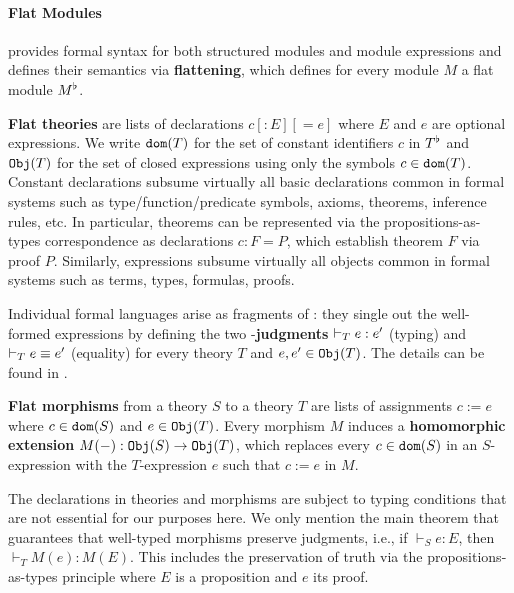 \paragraph{Flat Modules}
\mmt provides formal syntax for both structured modules and module expressions and defines their semantics via \textbf{flattening}, which defines for every module $M$ a flat module $M^\flat$.

\textbf{Flat theories} are lists of declarations $c[:E][=e]$ where $E$ and $e$ are optional expressions.
We write $\mathtt{dom}(T)$ for the set of constant identifiers $c$ in $T^\flat$ and $\mathtt{Obj}(T)$ for the set of closed expressions using only the symbols $c\in\mathtt{dom}(T)$.
Constant declarations subsume virtually all basic declarations common in formal systems such as type/function/predicate symbols, axioms, theorems, inference rules, etc.
In particular, theorems can be represented via the propositions-as-types correspondence as declarations $c:F=P$, which establish theorem $F$ via proof $P$.
Similarly, \mmt expressions subsume virtually all objects common in formal systems such as terms, types, formulas, proofs.

Individual formal languages arise as fragments of \mmt: they single out the well-formed expressions by defining the two \mmt-\textbf{judgments} $\vdash_T e:e'$ (typing) and $\vdash_T e\equiv e'$ (equality) for every theory $T$ and $e,e'\in\mathtt{Obj}(T)$.
The details can be found in \cite{rabe:howto:14}.

\textbf{Flat morphisms} from a theory $S$ to a theory $T$ are lists of assignments $c:=e$ where $c\in\mathtt{dom}(S)$ and $e\in\mathtt{Obj}(T)$.
Every morphism $M$ induces a \textbf{homomorphic extension} $M(-):\mathtt{Obj}(S)\to\mathtt{Obj}(T)$, which replaces every $c\in\mathtt{dom}(S)$ in an $S$-expression with the $T$-expression $e$ such that $c:=e$ in $M$.

The declarations in theories and morphisms are subject to typing conditions that are not essential for our purposes here.
We only mention the main theorem that guarantees that well-typed morphisms preserve judgments, i.e., if $\vdash_S e:E$, then $\vdash_T M(e):M(E)$.
This includes the preservation of truth via the propositions-as-types principle where $E$ is a proposition and $e$ its proof.

